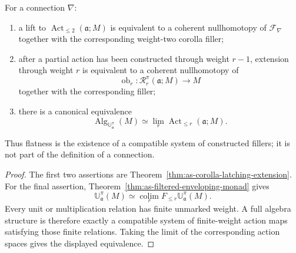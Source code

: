 \begin{theorem}
\label{thm:as-flatness-criterion}
For a connection $\nabla$:
\begin{enumerate}
    \item a lift to
    $\operatorname{Act}_{\le2}(\mathfrak a;M)$ is equivalent to a coherent
    nullhomotopy of $\mathcal F_\nabla$ together with the corresponding
    weight-two corolla filler;
    \item after a partial action has been constructed through weight $r-1$,
    extension through weight $r$ is equivalent to a coherent nullhomotopy of
    \[
        \operatorname{ob}_r:
        \mathcal R_r^\pi(\mathfrak a;M)\longrightarrow M
    \]
    together with the corresponding filler;
    \item there is a canonical equivalence
    \[
    \boxed{
        \operatorname{Alg}_{\mathbb U_{\mathfrak a}^{\pi}}(M)
        \simeq
        \lim_r\operatorname{Act}_{\le r}(\mathfrak a;M).
    }
    \]
\end{enumerate}
Thus flatness is the existence of a compatible system of constructed fillers;
it is not part of the definition of a connection.
\end{theorem}

\begin{proof}
The first two assertions are
Theorem~\ref{thm:as-corolla-latching-extension}.  For the final assertion,
Theorem~\ref{thm:as-filtered-enveloping-monad} gives
\[
    \mathbb U_{\mathfrak a}^{\pi}(M)
    \simeq
    \operatorname*{colim}_r
    F_{\le r}\mathbb U_{\mathfrak a}^{\pi}(M).
\]
Every unit or multiplication relation has finite unmarked weight.  A full
algebra structure is therefore exactly a compatible system of finite-weight
action maps satisfying those finite relations.  Taking the limit of the
corresponding action spaces gives the displayed equivalence.
\end{proof}

